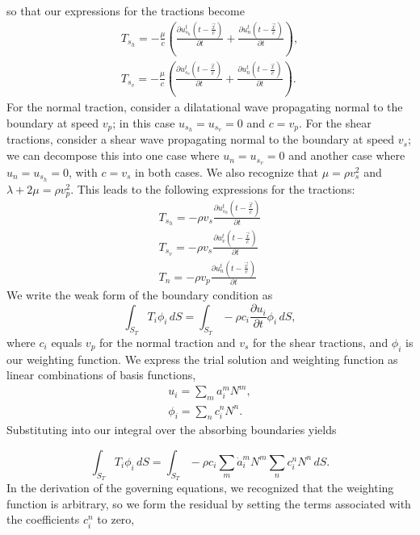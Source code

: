 so that our expressions for the tractions become
\begin{gather}
T_{s_{h}}=-\frac{\mu}{c}\left(\frac{\partial u_{s_{h}}^{t}(t-\frac{\vec{x}}{c})}{\partial t}+\frac{\partial u_{n}^{t}(t-\frac{\vec{x}}{c})}{\partial t}\right),\\
T_{s_{v}}=-\frac{\mu}{c}\left(\frac{\partial u_{s_{v}}^{t}(t-\frac{\vec{x}}{c})}{\partial t}+\frac{\partial u_{n}^{t}(t-\frac{\vec{x}}{c})}{\partial t}\right).
\end{gather}
For the normal traction, consider a dilatational wave propagating
normal to the boundary at speed $v_{p}$; in this case $u_{s_{h}}=u_{s_{v}}=0$
and $c=v_{p}$. For the shear tractions, consider a shear wave propagating
normal to the boundary at speed $v_{s}$; we can decompose this into
one case where $u_{n}=u_{s_{v}}=0$ and another case where $u_{n}=u_{s_{h}}=0$,
with $c=v_{s}$ in both cases. We also recognize that $\mu=\rho v_{s}^{2}$
and $\lambda+2\mu=\rho v_{p}^{2}$. This leads to the following expressions
for the tractions:
\begin{gather}
T_{s_{h}}=-\rho v_{s}\frac{\partial u_{s_{h}}^{t}(t-\frac{\vec{x}}{c})}{\partial t}\\
T_{s_{v}}=-\rho v_{s}\frac{\partial u_{v}^{t}(t-\frac{\vec{x}}{c})}{\partial t}\\
T_{n}=-\rho v_{p}\frac{\partial u_{n}^{t}(t-\frac{\vec{x}}{c})}{\partial t}
\end{gather}
We write the weak form of the boundary condition as
\[
\int_{S_{T}}T_{i}\phi_{i}\, dS=\int_{S_{T}}-\rho c_{i}\frac{\partial u_{i}}{\partial t}\phi_{i}\, dS,
\]
where $c_{i}$ equals $v_{p}$ for the normal traction and $v_{s}$
for the shear tractions, and $\phi_{i}$ is our weighting function.
We express the trial solution and weighting function as linear combinations
of basis functions,
\begin{gather}
u_{i}=\sum_{m}a_{i}^{m}N^{m},\\
\phi_{i}=\sum_{n}c_{i}^{n}N^{n}.
\end{gather}
Substituting into our integral over the absorbing boundaries yields

\begin{equation}
\int_{S_{T}}T_{i}\phi_{i}\, dS=\int_{S_{T}}-\rho c_{i}\sum_{m}\dot{a}_{i}^{m}N^{m}\sum_{n}c_{i}^{n}N^{n}\, dS.
\end{equation}
In the derivation of the governing equations, we recognized that the
weighting function is arbitrary, so we form the residual by setting
the terms associated with the coefficients $c_{i}^{n}$ to zero,

